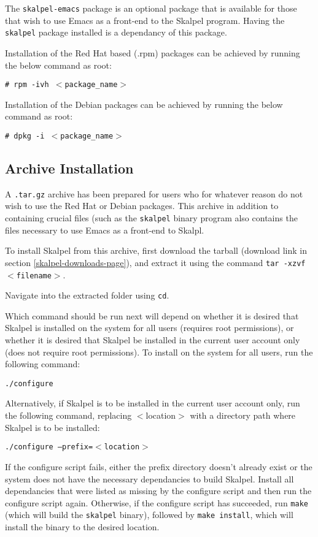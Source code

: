 \documentclass{report}
\begin{document}
The \texttt{skalpel-emacs} package is an optional package that is
available for those that wish to use Emacs as a front-end to the
Skalpel program. Having the \texttt{skalpel} package installed is a
dependancy of this package.

Installation of the Red Hat based (.rpm) packages can be achieved by
running the below command as root:

\texttt{\# rpm -ivh $<$package\_name$>$}

Installation of the Debian packages can be achieved by running the
below command as root:

\texttt{\# dpkg -i $<$package\_name$>$}

\subsection {Archive Installation}
\label{archive-installation}

A \texttt{.tar.gz} archive has been prepared for users who for
whatever reason do not wish to use the Red Hat or Debian
packages. This archive in addition to containing crucial files (such
as the \texttt{skalpel} binary program also contains the files
necessary to use Emacs as a front-end to Skalpl.

To install Skalpel from this archive, first download the tarball
(download link in section \ref{skalpel-downloads-page}), and extract
it using the command \texttt{tar -xzvf $<$filename$>$}.

Navigate into the extracted folder using \texttt{cd}.

Which command should be run next will depend on whether it is desired
that Skalpel is installed on the system for all users (requires root
permissions), or whether it is desired that Skalpel be installed in the
current user account only (does not require root permissions). To
install on the system for all users, run the following command:

\texttt{./configure}

Alternatively, if Skalpel is to be installed in the current user
account only, run the following command, replacing
$<$location$>$ with a directory path where Skalpel is to be installed:

\texttt{./configure --prefix=$<$location$>$}

If the configure script fails, either the prefix directory doesn't
already exist or the system does not have the necessary dependancies
to build Skalpel. Install all dependancies that were listed as missing
by the configure script and then run the configure script
again. Otherwise, if the configure script has succeeded, run
\texttt{make} (which will build the \texttt{skalpel} binary), followed
by \texttt{make install}, which will install the binary to the desired
location.
\end{document}
